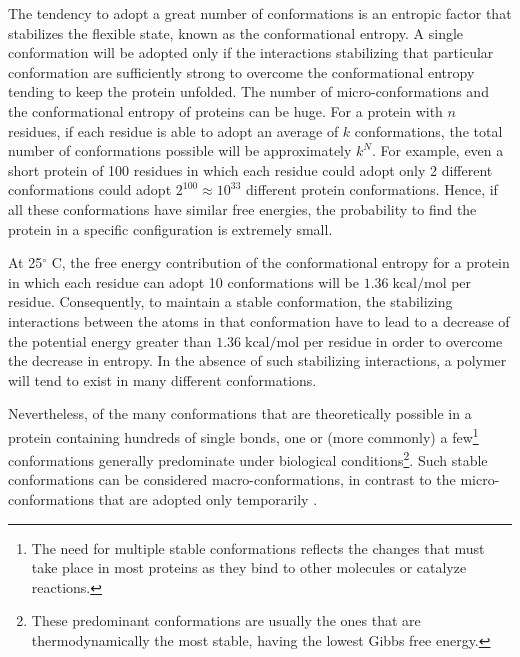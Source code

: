 
The tendency to adopt a great number of conformations is an entropic factor that stabilizes the flexible state, known as the conformational entropy.
A single conformation will be adopted only if the interactions stabilizing that particular conformation are sufficiently strong to overcome the conformational entropy tending to keep the protein unfolded. The number of micro-conformations and the conformational entropy of proteins can be huge. For a protein with $n$ residues, if each residue is able to adopt an average of $k$ conformations, the total number of conformations possible will be approximately $k^N$. For example, even a short protein of 100 residues in which each residue could adopt only 2 different conformations could adopt $2^{100} \approx 10^{33}$ different protein conformations. Hence, if all these conformations have similar free energies, the probability to find the protein in a specific configuration is extremely small. 

At 25$^\circ$ C, the free energy contribution of the conformational entropy for a protein in which each residue can adopt 10 conformations will be $1.36 \;\text{kcal}/\text{mol}$ per residue. Consequently, to maintain a stable conformation, the stabilizing interactions between the atoms in that conformation have to lead to a decrease of the potential energy greater than $1.36 \;\text{kcal}/\text{mol}$ per residue in order to overcome the decrease in entropy. In the absence of such stabilizing interactions, a polymer will tend to exist in many different conformations. 

Nevertheless, of the many conformations that are theoretically possible in a protein containing hundreds of single bonds, one or (more commonly) a few\footnote{The need for multiple stable conformations reflects the changes that must take place in most proteins as they bind to other molecules or catalyze reactions.} conformations generally predominate under biological conditions\footnote{These predominant conformations are usually the ones that are thermodynamically the most stable, having the lowest Gibbs free energy.}. Such stable conformations can be considered macro-conformations, in contrast to the micro-conformations that are adopted only temporarily
\cite{creighton2010biophysical}.

